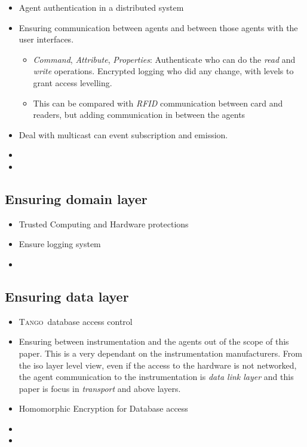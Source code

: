 \documentclass[10pt,a4paper,twoside]{llncs}
\newcommand{\tango}{\textsc{Tango}}
\begin{document}
\begin{itemize}
 \item Agent authentication in a distributed system
 \item Ensuring communication between agents and between those agents with the user interfaces.
 \begin{itemize}
  \item \emph{Command}, \emph{Attribute}, \emph{Properties}: Authenticate who can do the \emph{read} and \emph{write} operations. Encrypted logging who did any change, with levels to grant access levelling.
  \item This can be compared with \emph{RFID} communication between card and readers, but adding communication in between the agents
 \end{itemize}
 \item Deal with multicast can event subscription and emission.
 \item 
 \item 
\end{itemize}

%
\subsection{Ensuring domain layer \label{sec:domainLayer}}

\begin{itemize}
 \item Trusted Computing and Hardware protections
 \item Ensure logging system
 \item 
\end{itemize}

%
\subsection{Ensuring data layer \label{sec:dataLayer}}

\begin{itemize}
 \item \tango\, database access control
 \item Ensuring between instrumentation and the agents out of the scope of this paper. This is a very dependant on the instrumentation manufacturers. From the iso layer level view, even if the access to the hardware is not networked, the agent communication to the instrumentation is \emph{data link layer} and this paper is focus in \emph{transport} and above layers.
 \item Homomorphic Encryption for Database access
 \item  
 \item 
\end{itemize}
\end{document}
